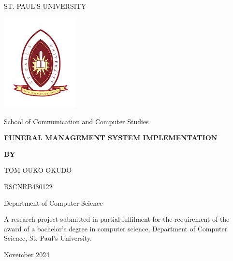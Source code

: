\documentclass[a4paper,12pt]{report}
\begin{document}
\begin{titlepage}
    \centering
    {\LARGE ST. PAUL’S UNIVERSITY \par}
    \vspace{0.5cm}
    
    \includegraphics[width=0.3\textwidth]{../img/logo.png} %
    
    \vspace{0.5cm}
    {\LARGE School of Communication and Computer Studies \par}
    \vspace{1.5cm}
    
    {\Huge \textbf{FUNERAL MANAGEMENT SYSTEM IMPLEMENTATION} \par}
    \vspace{2cm}
    
    {\Large \textbf{BY} \par}
    \vspace{0.5cm}
    {\Large TOM OUKO OKUDO \par}
    {\Large BSCNRB480122 \par}
    \vspace{2cm}
    
    {\LARGE Department of Computer Science \par}
    \vfill
    
    {\large A research project submitted in partial fulfilment for the requirement of the award of a bachelor’s degree in computer science, Department of Computer Science, St. Paul’s University. \par}
    \vspace{1.5cm}
    
    {\large November 2024 \par}
\end{titlepage}

\newpage
\end{document}
